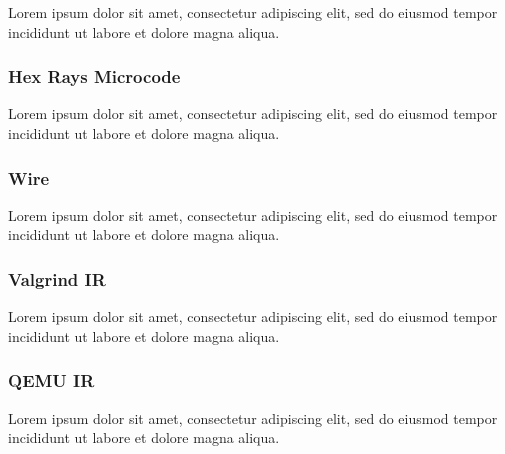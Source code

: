 \documentclass[12pt, a4paper]{article}
\begin{document}

Lorem ipsum dolor sit amet, consectetur adipiscing elit, sed do eiusmod tempor incididunt ut labore et dolore magna aliqua.


\subsubsection{Hex Rays Microcode}

Lorem ipsum dolor sit amet, consectetur adipiscing elit, sed do eiusmod tempor incididunt ut labore et dolore magna aliqua.

\cite{hexrays}


\subsubsection{Wire}


Lorem ipsum dolor sit amet, consectetur adipiscing elit, sed do eiusmod tempor incididunt ut labore et dolore magna aliqua.



\subsubsection{Valgrind IR}

Lorem ipsum dolor sit amet, consectetur adipiscing elit, sed do eiusmod tempor incididunt ut labore et dolore magna aliqua.


\subsubsection{QEMU IR}

Lorem ipsum dolor sit amet, consectetur adipiscing elit, sed do eiusmod tempor incididunt ut labore et dolore magna aliqua.
\end{document}
